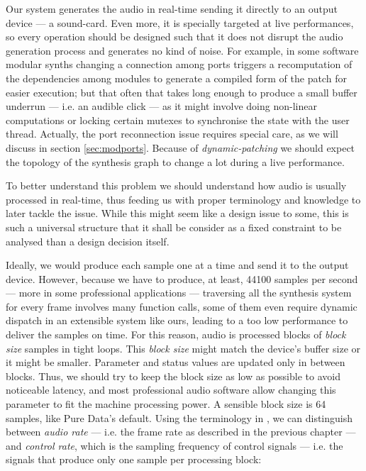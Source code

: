Our system generates the audio in real-time sending it directly to an
output device --- a sound-card. Even more, it is specially targeted at
live performances, so every operation should be designed such that it
does not disrupt the audio generation process and generates no kind of
noise. For example, in some software modular synths changing a
connection among ports triggers a recomputation of the dependencies
among modules to generate a compiled form of the patch for easier
execution; but that often that takes long enough to produce a small
buffer underrun --- i.e. an audible click --- as it might involve
doing non-linear computations or locking certain mutexes to
synchronise the state with the user thread. Actually, the port
reconnection issue requires special care, as we will discuss in
section \ref{sec:modports}. Because of \emph{dynamic-patching} we
should expect the topology of the synthesis graph to change a lot
during a live performance.

To better understand this problem we should understand how audio is
usually processed in real-time, thus feeding us with proper
terminology and knowledge to later tackle the issue. While this might
seem like a design issue to some, this is such a universal structure
that it shall be consider as a fixed constraint to be analysed than a
design decision itself.

Ideally, we would produce each sample one at a time and send it to the
output device. However, because we have to produce, at least, 44100
samples per second --- more in some professional applications ---
traversing all the synthesis system for every frame involves many
function calls, some of them even require dynamic dispatch in an
extensible system like ours, leading to a too low performance to
deliver the samples on time. For this reason, audio is processed
blocks of \emph{block size} samples in tight loops. This \emph{block
  size} might match the device's buffer size or it might be
smaller. Parameter and status values are updated only in between
blocks. Thus, we should try to keep the block size as low as possible
to avoid noticeable latency, and most professional audio software
allow changing this parameter to fit the machine processing power. A
sensible block size is 64 samples, like Pure Data's default. Using the
terminology in \cite{boulanger10audio}, we can distinguish between
\emph{audio rate} --- i.e. the frame rate as described in the previous
chapter --- and \emph{control rate}, which is the sampling frequency
of control signals --- i.e. the signals that produce only one sample
per processing block:


